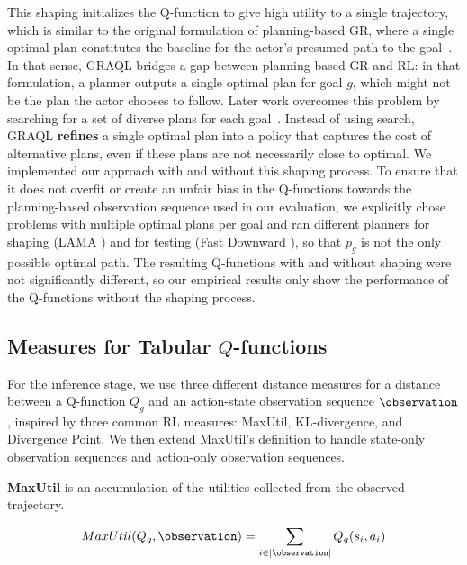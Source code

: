 \documentclass[letterpaper]{article} %
\begin{document}
This shaping initializes the Q-function to give high utility to a single trajectory, which is similar to the original formulation of planning-based GR, where a single optimal plan constitutes the baseline for the actor's presumed path to the goal~\cite{ramirez2009plan}.
In that sense, GRAQL bridges a gap between planning-based GR and RL: in that formulation, a planner outputs a single optimal plan for goal $g$, which might not be the plan the actor chooses to follow.
%
%
Later work overcomes this problem by searching for a set of diverse plans for each goal~\cite{sohrabi2016plan}.
%
Instead of using search, GRAQL \textbf{refines} a single optimal plan into a  policy that captures the cost of alternative plans, even if these plans are not necessarily close to optimal.
%
We implemented our approach with and without this shaping process.
To ensure that it does not overfit or create an unfair bias in the Q-functions towards the planning-based observation sequence used in our evaluation, we explicitly chose problems with multiple optimal plans per goal and ran different planners for shaping (LAMA \cite{richter2010lama}) and for testing (Fast Downward \cite{helmert2006fast}), so that $p_g$ is not the only possible optimal path.
The resulting Q-functions with and without shaping were not significantly different, so our empirical results only show the performance of the Q-functions without the shaping process.


\subsection{Measures for Tabular $Q$-functions}
For the inference stage, we use three different distance measures for a distance between a Q-function $Q_g$ and an action-state observation sequence $\observation$, inspired by three common RL measures: MaxUtil, KL-divergence, and Divergence Point.
We then extend MaxUtil's definition to handle state-only observation sequences and action-only observation sequences.

\noindent \textbf{MaxUtil} is an accumulation of the utilities collected from the observed trajectory.

\begin{equation}
    MaxUtil(Q_g, \observation) = \displaystyle\sum\limits_{i \in |\observation|} Q_g(s_i,a_i)
\end{equation}
\end{document}
